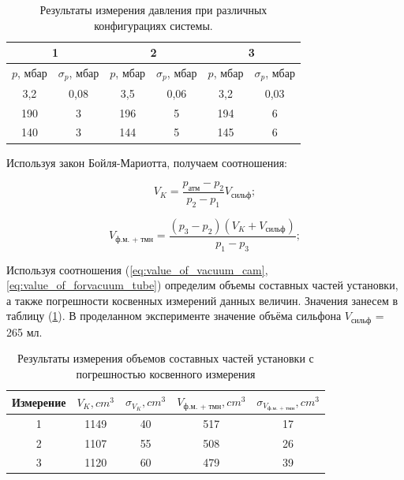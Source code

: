 \documentclass[a4paper, 12pt]{article} %
\begin{document}
\begin{table}[h]
	\begin{center}
		\begin{tabular}{|c|c|c|c|c|c|}
		\hline
		\multicolumn{2}{|c|}{1} & \multicolumn{2}{c|}{2} & \multicolumn{2}{c|}{3} \\ \hline
		$p$, мбар  & $\sigma_{p}$, мбар & $p$, мбар & $\sigma_{p}$, мбар & $p$, мбар & $\sigma_{p}$, мбар \\ \hline
		3,2     & 0,08         & 3,5    & 0,06         & 3,2 & 0,03         \\ \hline
		190      & 3            & 196     & 5            & 194     & 6            \\ \hline
		140      & 3            & 144     & 5            & 145     & 6            \\ \hline
		\end{tabular}
		\caption{Результаты измерения давления при различных конфигурациях системы.}
	\end{center}
\end{table}

Используя закон Бойля-Мариотта, получаем соотношения:

\begin{equation}
		V_{K} = \frac{p_{\text{атм}} - p_{2}}{p_{2} - p_{1}} V_{\text{сильф}};
		\label{eq:value_of_vacuum_cam}
\end{equation}
	
\begin{equation}
		V_{\text{ф.м. + тмн}} = \frac{ \left( p_{3} - p_{2}\right) \left( V_{K} + V_{\text{сильф}}\right) }{p_{1} - p_{3}};
		\label{eq:value_of_forvacuum_tube}
\end{equation}

Используя соотношения (\ref{eq:value_of_vacuum_cam}, \ref{eq:value_of_forvacuum_tube}) определим объемы составных частей установки, а также погрешности косвенных измерений данных величин. Значения занесем в таблицу (\ref{tab:resultsof_measuring_for_diffrent_part_value}). В проделанном эксперименте значение объёма сильфона $V_{\text{сильф}}$ = 265 мл.

\begin{table}[h]
	\begin{center}
		\begin{tabular}{|c|c|c|c|c|}
		\hline
		Измерение & $V_{K}, cm^{3}$ & $\sigma_{V_{K}}, cm^{3}$ & $V_{\text{ф.м. + тмн}}, cm^{3}$ & $\sigma_{V_{\text{ф.м. + тмн}}}, cm^{3}$ \\ \hline
		1 & 1149 & 40 & 517 & 17 \\ \hline
		2 & 1107 & 55 & 508 & 26 \\ \hline
		3 & 1120 & 60 & 479 & 39 \\ \hline
		\end{tabular}
	\end{center}
	\caption{Результаты измерения объемов составных частей установки с погрешностью косвенного измерения}
	\label{tab:resultsof_measuring_for_diffrent_part_value}
\end{table}
\end{document}

